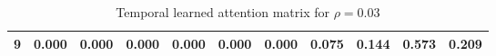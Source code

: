 \documentclass{article}
\begin{document}
\begin{table}[h]
\begin{tabular}{lcccccccccc}
9 & {\cellcolor[HTML]{FFF7FB}} \color[HTML]{000000} 0.000 & {\cellcolor[HTML]{FFF7FB}} \color[HTML]{000000} 0.000 & {\cellcolor[HTML]{FFF7FB}} \color[HTML]{000000} 0.000 & {\cellcolor[HTML]{FFF7FB}} \color[HTML]{000000} 0.000 & {\cellcolor[HTML]{FFF7FB}} \color[HTML]{000000} 0.000 & {\cellcolor[HTML]{FFF7FB}} \color[HTML]{000000} 0.000 & {\cellcolor[HTML]{EEE8F3}} \color[HTML]{000000} 0.075 & {\cellcolor[HTML]{D5D5E8}} \color[HTML]{000000} 0.144 & {\cellcolor[HTML]{023858}} \color[HTML]{F1F1F1} 0.573 & {\cellcolor[HTML]{023858}} \color[HTML]{F1F1F1} 0.209 \\
\bottomrule
\end{tabular}
\vskip 0.05in
\caption{Temporal learned attention matrix for $\rho = 0.03$}
    \label{tab:attn_ts}
\end{table}
\end{document}
